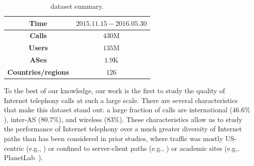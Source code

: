 \begin{table}[t!]
\centering
\begin{small}
\begin{tabular}{cc}
\hline
{\bf Time}          & $2015.11.15 - 2016.05.30$ \\ \hline
{\bf Calls}         & $430$M                  \\ \hline
{\bf Users}         & $135$M                 \\ \hline
{\bf ASes}          & $1.9$K                  \\ \hline
{\bf Countries/regions}     & $126$                 \\ \hline
\end{tabular}
\end{small}
\caption{\skype dataset summary.}
\label{tab:dataset}
\end{table}

To the best of our knowledge, our work is the first to 
study the quality of Internet telephony calls at such 
a large scale.
There are several characteristics that make this dataset
stand out: a large fraction of calls are international 
($46.6\%$), inter-AS ($80.7\%$), and wireless ($83\%$). %
These characteristics allow us to study the performance 
of Internet telephony over a much greater diversity of 
Internet paths than has been considered in prior studies,
 where traffic was mostly US-centric (e.g., 
 \cite{xbox-sigcomm09}) or confined to server-client 
 paths (e.g., \cite{sigcomm11conviva}) or academic 
 sites (e.g., PlanetLab~\cite{iplaneosdi}).
 
	
 

